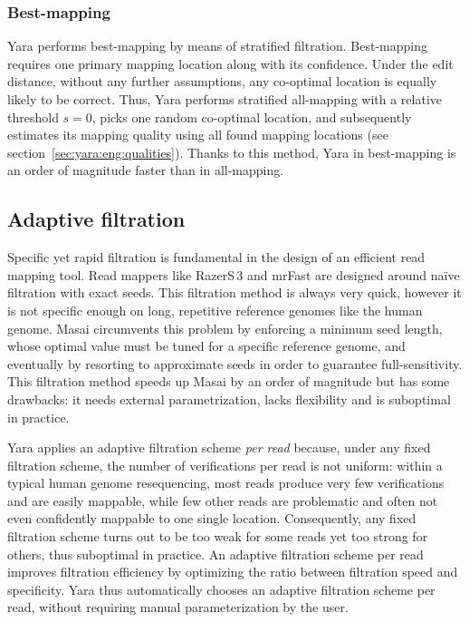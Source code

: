 \subsubsection{Best-mapping}
Yara performs best-mapping by means of stratified filtration.
Best-mapping requires one primary mapping location along with its confidence.
Under the edit distance, without any further assumptions, any co-optimal location is equally likely to be correct.
Thus, Yara performs stratified all-mapping with a relative threshold $s=0$, picks one random co-optimal location, and subsequently estimates its mapping quality using all found mapping locations (see section~\ref{sec:yara:eng:qualities}).
Thanks to this method, Yara in best-mapping is an order of magnitude faster than in all-mapping.


\subsection{Adaptive filtration}
\label{sec:yara:eng:adaptive}

Specific yet rapid filtration is fundamental in the design of an efficient read mapping tool.
Read mappers like RazerS\,3 \citep{Weese2012} and mrFast \citep{Ahmadi2012} are designed around na\"ive filtration with exact seeds.
This filtration method is always very quick, however it is not specific enough on long, repetitive reference genomes like the human genome.
Masai \citep{Siragusa2013} circumvents this problem by enforcing a minimum seed length,
whose optimal value must be tuned for a specific reference genome, and eventually by resorting to approximate seeds in order to guarantee full-sensitivity.
This filtration method speeds up Masai by an order of magnitude but has some drawbacks:
it needs external parametrization, lacks flexibility and is suboptimal in practice.

Yara applies an adaptive filtration scheme \emph{per read} because, under any fixed filtration scheme, the number of verifications per read is not uniform: within a typical human genome resequencing, most reads produce very few verifications and are easily mappable, while few other reads are problematic and often not even confidently mappable to one single location.
Consequently, any fixed filtration scheme turns out to be too weak for some reads yet too strong for others, thus suboptimal in practice.
An adaptive filtration scheme per read improves filtration efficiency by optimizing the ratio between filtration speed and specificity.
Yara thus automatically chooses an adaptive filtration scheme per read, without requiring manual parameterization by the user.

